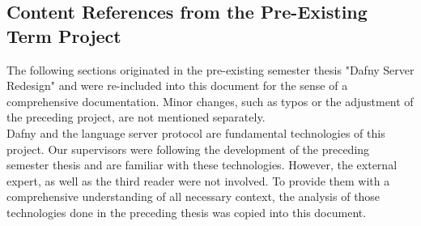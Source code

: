 \subsection{Content References from the Pre-Existing Term Project}
The following sections originated in the pre-existing semester thesis "Dafny Server Redesign" \cite{sa} and were re-included into this document for the sense of a comprehensive documentation.
Minor changes, such as typos or the adjustment of the preceding project, are not mentioned separately.\\

Dafny and the language server protocol are fundamental technologies of this project.
Our supervisors were following the development of the preceding semester thesis and are familiar with these technologies.
However, the external expert, as well as the third reader were not involved.
To provide them with a comprehensive understanding of all necessary context, the analysis of those technologies done in the preceding thesis was copied into this document.

